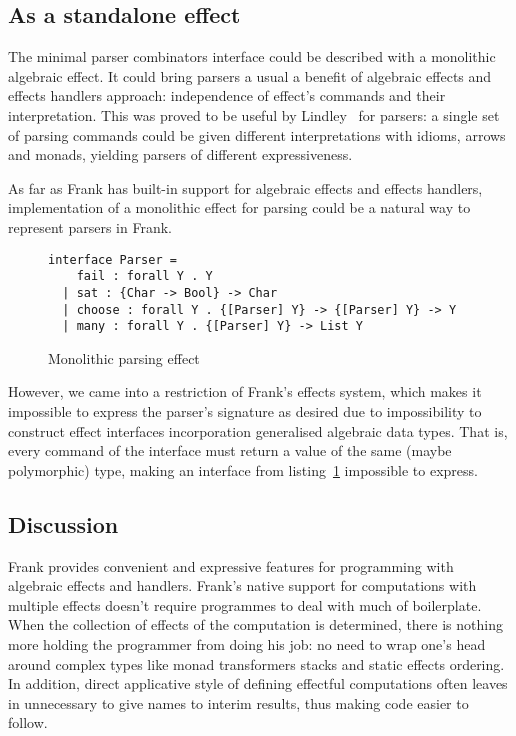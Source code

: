   \subsection{As a standalone effect}

    The minimal parser combinators interface could be described with a monolithic
    algebraic effect. It could bring parsers a usual a benefit of algebraic effects
    and effects handlers approach: independence of effect's commands and their interpretation.
    This was proved to be useful by Lindley~\cite{Lindley:2014:AEE:2633628.2633636}
    for parsers: a single set of parsing commands could be given different interpretations
    with idioms, arrows and monads, yielding parsers of different expressiveness.

    As far as Frank has built-in support for algebraic effects and effects handlers,
    implementation of a monolithic effect for parsing could be a natural way to
    represent parsers in Frank.

    \begin{figure}[h]
    \begin{lstlisting}
interface Parser =
    fail : forall Y . Y
  | sat : {Char -> Bool} -> Char
  | choose : forall Y . {[Parser] Y} -> {[Parser] Y} -> Y
  | many : forall Y . {[Parser] Y} -> List Y
    \end{lstlisting}
    \caption{Monolithic parsing effect}
    \label{listing:parserEffMono}
    \end{figure}

    However, we came into a restriction of Frank's
    effects system, which makes it impossible to express the parser's signature
    as desired due to impossibility to construct effect interfaces incorporation
    generalised algebraic data types. That is, every command of the interface must
    return a value of the same (maybe polymorphic) type, making an interface from
    listing~\ref{listing:parserEffMono} impossible to express.

   \subsection{Discussion}

    Frank provides convenient and expressive features for programming with
    algebraic effects and handlers. Frank's native support for computations with
    multiple effects doesn't require programmes to deal with much of boilerplate.
    When the collection of effects of the computation is determined, there is nothing
    more holding the programmer from doing his job: no need to wrap one's head around
    complex types like monad transformers stacks and static effects ordering.
    In addition, direct applicative style of defining effectful computations often
    leaves in unnecessary to give names to interim results, thus making code
    easier to follow.

